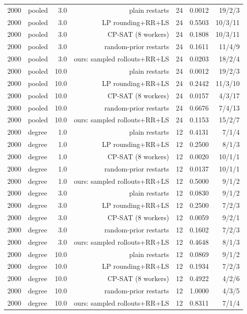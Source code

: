 \begin{table}[t]
\begin{tabular}{llrrrrr}
2000 & pooled & 3.0 & plain restarts & 24 & 0.0012 & 19/2/3 \\
2000 & pooled & 3.0 & LP rounding+RR+LS & 24 & 0.5503 & 10/3/11 \\
2000 & pooled & 3.0 & CP-SAT (8 workers) & 24 & 0.1808 & 10/3/11 \\
2000 & pooled & 3.0 & random-prior restarts & 24 & 0.1611 & 11/4/9 \\
2000 & pooled & 3.0 & ours: sampled rollouts+RR+LS & 24 & 0.0203 & 18/2/4 \\
2000 & pooled & 10.0 & plain restarts & 24 & 0.0012 & 19/2/3 \\
2000 & pooled & 10.0 & LP rounding+RR+LS & 24 & 0.2442 & 11/3/10 \\
2000 & pooled & 10.0 & CP-SAT (8 workers) & 24 & 0.0157 & 4/3/17 \\
2000 & pooled & 10.0 & random-prior restarts & 24 & 0.6676 & 7/4/13 \\
2000 & pooled & 10.0 & ours: sampled rollouts+RR+LS & 24 & 0.1153 & 15/2/7 \\
2000 & degree & 1.0 & plain restarts & 12 & 0.4131 & 7/1/4 \\
2000 & degree & 1.0 & LP rounding+RR+LS & 12 & 0.2500 & 8/1/3 \\
2000 & degree & 1.0 & CP-SAT (8 workers) & 12 & 0.0020 & 10/1/1 \\
2000 & degree & 1.0 & random-prior restarts & 12 & 0.0137 & 10/1/1 \\
2000 & degree & 1.0 & ours: sampled rollouts+RR+LS & 12 & 0.5000 & 9/1/2 \\
2000 & degree & 3.0 & plain restarts & 12 & 0.0830 & 9/1/2 \\
2000 & degree & 3.0 & LP rounding+RR+LS & 12 & 0.2500 & 7/2/3 \\
2000 & degree & 3.0 & CP-SAT (8 workers) & 12 & 0.0059 & 9/2/1 \\
2000 & degree & 3.0 & random-prior restarts & 12 & 0.1602 & 7/2/3 \\
2000 & degree & 3.0 & ours: sampled rollouts+RR+LS & 12 & 0.4648 & 8/1/3 \\
2000 & degree & 10.0 & plain restarts & 12 & 0.0869 & 9/1/2 \\
2000 & degree & 10.0 & LP rounding+RR+LS & 12 & 0.1934 & 7/2/3 \\
2000 & degree & 10.0 & CP-SAT (8 workers) & 12 & 0.4922 & 4/2/6 \\
2000 & degree & 10.0 & random-prior restarts & 12 & 1.0000 & 4/3/5 \\
2000 & degree & 10.0 & ours: sampled rollouts+RR+LS & 12 & 0.8311 & 7/1/4 \\

\end{tabular}
\end{table}
